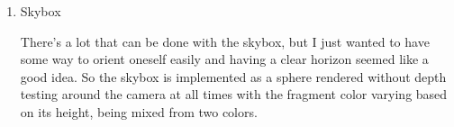 \documentclass[11pt]{article}
\begin{document}
\begin{enumerate}
\item Skybox
\label{sec:orgdbf3d1d}

There's a lot that can be done with the skybox, but I just wanted to have some way to orient oneself easily and having a clear horizon seemed like a good idea. So the skybox is implemented as a sphere rendered without depth testing around the camera at all times with the fragment color varying based on its height, being mixed from two colors.
\end{enumerate}
\end{document}
